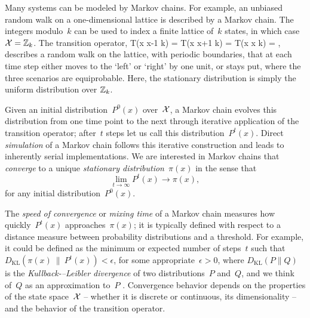 \documentclass[angelino.tex]{subfiles}
\begin{document}
Many systems can be modeled by Markov chains.
For example, an unbiased random walk on a one-dimensional lattice is described
by a Markov chain.  The integers modulo~$k$ can be used to index a finite
lattice of~$k$ states, in which case~${{\mathcal X} = \mathbb{Z}_k}$.
The transition operator,
\be
T(x \rightarrow x-1 \mod k) = T(x \rightarrow x+1 \mod k) =  T(x \rightarrow x \mod k) = , \label{random-walk}
\ee
describes a random walk on the lattice, with periodic boundaries,
that at each time step either moves to the `left' or `right' by one unit,
or stays put, where the three scenarios are equiprobable.
Here, the stationary distribution is simply the uniform distribution over
$\mathbb{Z}_k$.

Given an initial distribution~$P^0(x)$ over~${\mathcal X}$, a Markov chain evolves this
distribution from one time point to the next through iterative application of
the transition operator; after~$t$ steps let us call this distribution~$P^t(x)$.
Direct \emph{simulation} of a Markov chain follows this iterative construction
and leads to inherently serial implementations.
We are interested in Markov chains that \emph{converge} to a unique
\emph{stationary distribution}~$\pi(x)$ in the sense that
\[
\lim_{t \rightarrow \infty} P^t(x) \rightarrow \pi(x),
\]
for any initial distribution~$P^0(x)$.

The \emph{speed of convergence} or \emph{mixing time} of a Markov chain measures
how quickly~$P^t(x)$ approaches~$\pi(x)$; it is typically defined with respect to
a distance measure between probability distributions and a threshold.
For example, it could be defined as the minimum or expected number of steps~$t$
such that~${D_{\text{KL}}(\pi(x) ~ \| ~ P^t(x)) < \epsilon}$,
for some appropriate~${\epsilon > 0}$, where $D_{\text{KL}}(P \| Q)$
is the \emph{Kullback-–Leibler divergence} of two distributions~$P$ and~$Q$,
and we think of~$Q$ as an approximation to~$P$ \citep{kullback:1951}.
Convergence behavior depends on the properties of the state space~${\mathcal X}$
-- \eg whether it is discrete or continuous, its dimensionality --
and the behavior of the transition operator.
\end{document}
